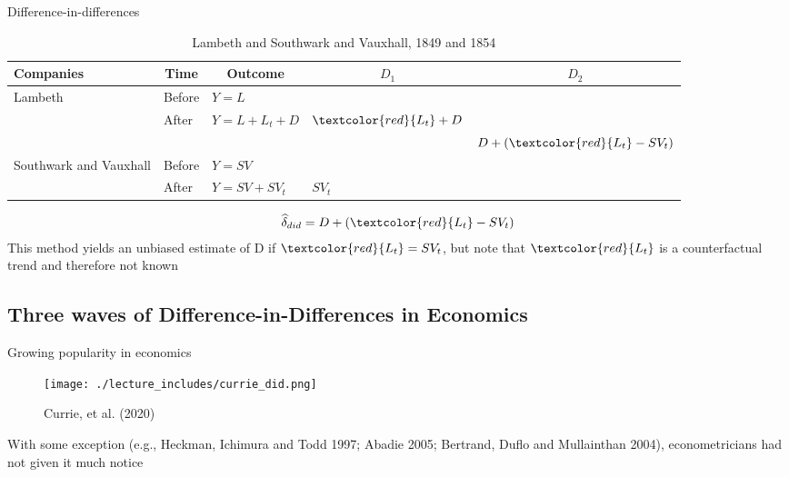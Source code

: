\documentclass{beamer}
\begin{document}
\begin{frame}{Difference-in-differences}

\begin{table}\centering
\scriptsize
		\caption{Lambeth and Southwark and Vauxhall, 1849 and 1854}
		\begin{center}
		\begin{tabular}{lll|lc}
		\toprule
		\multicolumn{1}{l}{\textbf{Companies}}&
		\multicolumn{1}{c}{\textbf{Time}}&
		\multicolumn{1}{c}{\textbf{Outcome}}&
		\multicolumn{1}{c}{$D_1$}&
		\multicolumn{1}{c}{$D_2$}\\
		\midrule
		Lambeth & Before & $Y=L$ \\
		& After & $Y=L + L_t + D$ & $\textcolor{red}{L_t}+D$\\
		\midrule
		& & & & $D + (\textcolor{red}{L_t}- SV_t)$ \\
		\midrule
		Southwark and Vauxhall & Before & $Y=SV$ \\
		& After & $Y=SV + SV_t$ & $SV_t$\\
		\bottomrule
		\end{tabular}
		\end{center}
	\end{table}

\begin{eqnarray*}
\widehat{\delta}_{did} = D + (\textcolor{red}{L_t}- SV_t)
\end{eqnarray*}This method yields an unbiased estimate of D if $\textcolor{red}{L_t} = SV_t$, but note that $\textcolor{red}{L_t}$ is a counterfactual trend and therefore not known

\end{frame}






\subsection{Three waves of Difference-in-Differences in Economics}

\begin{frame}{Growing popularity in economics}

	\begin{figure}
	\caption{Currie, et al. (2020)}
	\texttt{[image: ./lecture\_includes/currie\_did.png]}
	\end{figure}

\bigskip

\footnotesize

With some exception (e.g., Heckman, Ichimura and Todd 1997; Abadie 2005; Bertrand, Duflo and Mullainthan 2004), econometricians had not given it much notice

\end{frame}
\end{document}
